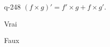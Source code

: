 \begin{truefalse}{q-248}
$(f\times g)' = f'\times g + f\times g'$.
\item* Vrai
\item Faux
\end{truefalse}

